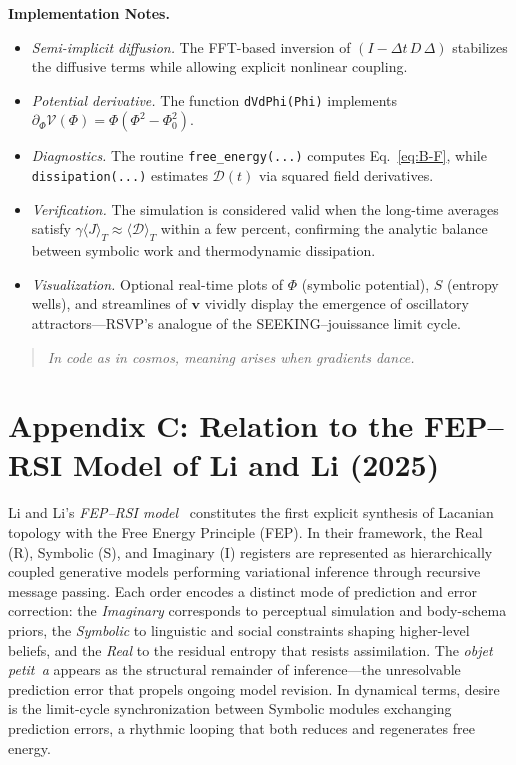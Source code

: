 \documentclass[12pt,a4paper]{article}
\begin{document}
\noindent
\textbf{Implementation Notes.}
\begin{itemize}[leftmargin=1.4em]
\item \emph{Semi-implicit diffusion.} The FFT-based inversion of $(I-\Delta t\,D\,\Delta)$ stabilizes the diffusive terms while allowing explicit nonlinear coupling.
\item \emph{Potential derivative.} The function \texttt{dVdPhi(Phi)} implements $\partial_\Phi \mathcal{V}(\Phi)=\Phi(\Phi^2-\Phi_0^2)$.
\item \emph{Diagnostics.} The routine \texttt{free_energy(...)} computes Eq.~\eqref{eq:B-F}, while \texttt{dissipation(...)} estimates $\mathcal{D}(t)$ via squared field derivatives.
\item \emph{Verification.} The simulation is considered valid when the long-time averages satisfy $\gamma\langle J\rangle_T \approx \langle\mathcal{D}\rangle_T$ within a few percent, confirming the analytic balance between symbolic work and thermodynamic dissipation.
\item \emph{Visualization.} Optional real-time plots of $\Phi$ (symbolic potential), $S$ (entropy wells), and streamlines of $\mathbf{v}$ vividly display the emergence of oscillatory attractors—RSVP’s analogue of the SEEKING–jouissance limit cycle.
\end{itemize}

\begin{quote}
\textit{In code as in cosmos, meaning arises when gradients dance.}
\end{quote}


\section*{Appendix C: Relation to the FEP–RSI Model of Li and Li (2025)}

Li and Li’s \emph{FEP–RSI model}~\citep{li2025formalizing} constitutes the first explicit synthesis of Lacanian topology with the Free Energy Principle (FEP).  
In their framework, the Real (R), Symbolic (S), and Imaginary (I) registers are represented as hierarchically coupled generative models performing variational inference through recursive message passing.  
Each order encodes a distinct mode of prediction and error correction: the \emph{Imaginary} corresponds to perceptual simulation and body-schema priors, the \emph{Symbolic} to linguistic and social constraints shaping higher-level beliefs, and the \emph{Real} to the residual entropy that resists assimilation.  
The \emph{objet petit~a} appears as the structural remainder of inference—the unresolvable prediction error that propels ongoing model revision.  
In dynamical terms, desire is the limit-cycle synchronization between Symbolic modules exchanging prediction errors, a rhythmic looping that both reduces and regenerates free energy.
\end{document}
